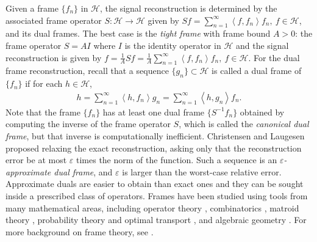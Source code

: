\documentclass{amsart}
\theoremstyle{definition}
\theoremstyle{remark}
\numberwithin{equation}{section}
\newcommand{\ip}[2]{\left\langle {#1} , {#2} \right\rangle} %
\begin{document}
 
Given a frame $\{ f_n\}$ in $\mathcal{H}$, the signal reconstruction is determined by the associated frame operator
$S:\mathcal{H}\to\mathcal{H}$ given by $    Sf=\sum\limits_{n=1}^{\infty}\ip{f}{f_{n}}f_{n}, \ f \in \mathcal{H}$,
and its dual frames. The best case is the \emph{tight frame} with frame bound $A>0$: the frame operator $S = A I$ where $I$ is the identity operator in $\mathcal{H}$ and the signal reconstruction is given by $f = \frac{1}{A}Sf = \frac{1}{A}\sum\limits_{n=1}^{\infty}\ip{f}{f_{n}}f_{n}, \ f \in \mathcal{H}$. For the dual frame reconstruction, recall that a sequence  $\{g_{n}\} \subset \mathcal{H}$ is called a dual frame of $\{f_{n}\}$ if for each $h\in \mathcal{H}$,
    \begin{align*}
        h=\sum_{n=1}^{\infty}\ip{h}{f_{n}}g_{n}=\sum_{n=1}^{\infty}\ip{h}{g_{n}}f_{n}.
    \end{align*} 
Note that the frame $\{ f_n\}$ has at least one dual frame $\{ S^{-1} f_n\}$ obtained by computing the inverse of the frame operator $S$, which is called the \emph{canonical dual frame},  but that inverse is computationally inefficient. Christensen and Laugesen \cite{CL10} proposed relaxing the exact reconstruction, asking only that the reconstruction error be at most $\varepsilon$ times the norm of the function. Such a sequence is an \emph{$\varepsilon$-approximate dual frame}, and $\varepsilon$ is larger than the worst-case relative error. Approximate duals are easier to obtain than exact ones and they can be sought inside a prescribed class of operators. 
Frames have been studied using tools from many mathematical areas, including operator theory \cite{christensen2017operator}, combinatorics \cite{bownik2015combinatorial}, matroid theory \cite{bernstein2020algebraic}, probability theory and optimal transport \cite{ehler2013probabilistic}, and algebraic geometry \cite{cahill2013algebraic}. For more background on frame theory, see \cite{christensen2003introduction}.
\end{document}
